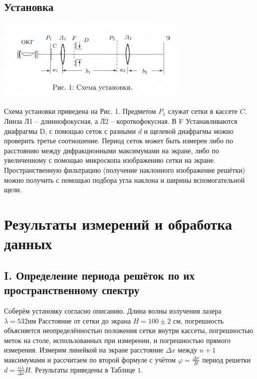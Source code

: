 \newpage
\subsection*{Установка}

\begin{center}
\includegraphics[width = 0.7\textwidth]{1.jpeg}
\end{center}

Схема установки приведена на Рис. 1. Предметом $P_{1}$ служат сетки в кассете $C .$ \\Линза Л1 -- длиннофокусная, а Л2 -- короткофокусная. В F Устанавливаются диафрагмы D, с помощью сеток с разными $d$ и щелевой диафрагмы можно проверить третье соотношение. Период сеток может быть измерен либо по расстоянию между дифракционными максимумами на экране, либо по увеличенному с помощью микроскопа изображению сетки на экране. Пространственную фильтрацию (получение наклонного изображение решётки) можно получить с помощью подбора угла наклона и ширины вспомогательной щели.

\section{Результаты измерений и обработка данных}

\subsection*{I. Определение периода решёток по их пространственному спектру}

Соберём установку согласно описанию. Длина волны излучения лазера $\lambda=532 \mathrm{нм}$
Расстояние от сетки до экрана $H=100 \pm 2$ см, погрешность объясняется неопределённостью положения сетки внутри кассеты, погрешностью меток на столе, использованных при измерении, и погрешностью прямого измерения. Измерим линейкой на экране расстояние $\Delta x$ между $n+1$ максимумами и рассчитаем по второй формуле с учётом $\varphi=\frac{\Delta x}{H}$ период решетки $d = \frac{n\lambda}{\Delta x}H$. Результаты приведены в Таблице $1 .$


